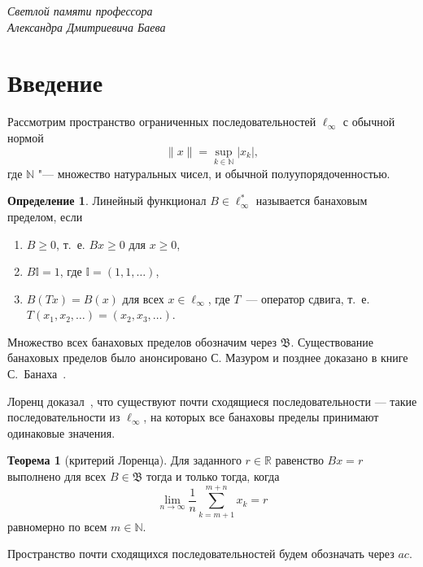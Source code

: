 \documentclass[a4paper,openbib]{article}
\renewcommand{\geq}{\geqslant} %
\theoremstyle{definition}
\newtheorem{theorem}[lemma]{Теорема}
\newtheorem{definition}[lemma]{Определение}
\begin{document}
\begin{flushright}
	\textit{
		Светлой памяти профессора \\
		Александра Дмитриевича Баева
	}
\end{flushright}

\section{Введение}

Рассмотрим пространство ограниченных последовательностей $\ell_\infty$ с обычной нормой
\begin{equation*}
	\|x\| = \sup_{k\in\mathbb{N}} |x_k|
	,
\end{equation*}
где $\mathbb{N}$ "--- множество натуральных чисел,
и обычной полуупорядоченностью.


\begin{definition}
	Линейный функционал $B\in \ell_\infty^*$ называется банаховым пределом,
	если
	\begin{enumerate}[label=(\roman*)]
		\item
			$B\geq0$, т.~е. $Bx \geq 0$ для $x \geq 0$,
		\item
			$B\mathbb{I}=1$, где $\mathbb{I} =(1,1,\ldots)$,
		\item
			$B(Tx)=B(x)$ для всех $x\in \ell_\infty$, где $T$~---
		оператор сдвига, т.~е. $T(x_1,x_2,\ldots)=(x_2,x_3,\ldots)$.
	\end{enumerate}
\end{definition}
Множество всех банаховых пределов обозначим через $\mathfrak{B}$.
Существование банаховых пределов было анонсировано С. Мазуром \cite{Mazur} и позднее доказано в книге С.~Банаха~\cite{banach2001theory_rus}.

Лоренц доказал~\cite{lorentz1948contribution}, что существуют почти сходящиеся последовательности ---
такие последовательности из $\ell_\infty$,
на которых все банаховы пределы принимают одинаковые значения.
\begin{theorem}[критерий Лоренца]
	Для заданного $r\in\mathbb{R}$ равенство $Bx=r$ выполнено для всех $B\in\mathfrak{B}$
	тогда и только тогда, когда
	\begin{equation}
		\label{eq:crit_Lorentz}
		\lim_{n\to\infty} \frac{1}{n} \sum_{k=m+1}^{m+n} x_k = r
	\end{equation}
	равномерно по всем $m\in\mathbb{N}$.
\end{theorem}


Пространство почти сходящихся последовательностей будем обозначать через $ac$.
\end{document}

